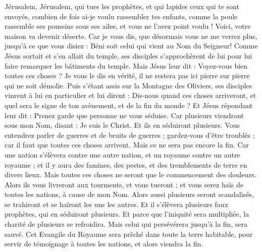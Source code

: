 \begin{multicols}{2}
Jérusalem, Jérusalem, qui tues les prophètes, et qui lapides ceux qui te sont envoyés, combien de fois ai-je voulu rassembler tes enfants, comme la poule rassemble ses poussins sous ses ailes, et vous ne l'avez point voulu !
Voici, votre maison va devenir déserte.
Car je vous dis, que désormais vous ne me verrez plus, jusqu'à ce que vous disiez : Béni soit celui qui vient au Nom du Seigneur!
\VerseOne{}Comme Jésus sortait et s'en allait du temple, ses disciples s'approchèrent de lui pour lui faire remarquer les bâtiments du temple.
Mais Jésus leur dit : Voyez-vous bien toutes ces choses ? Je vous le dis en vérité, il ne restera pas ici pierre sur pierre qui ne soit démolie.
Puis s'étant assis sur la Montagne des Oliviers, ses disciples vinrent à lui en particulier et lui dirent : Dis-nous quand ces choses arriveront, et quel sera le signe de ton avènement, et de la fin du monde ?
Et Jésus répondant leur dit : Prenez garde que personne ne vous séduise.
Car plusieurs viendront sous mon Nom, disant : Je suis le Christ. Et ils en séduiront plusieurs.
Vous entendrez parler de guerres et de bruits de guerres ; gardez-vous d'être troublés ; car il faut que toutes ces choses arrivent. Mais ce ne sera pas encore la fin.
Car une nation s'élèvera contre une autre nation, et un royaume contre un autre royaume ; et il y aura des famines, des pestes, et des tremblements de terre en divers lieux.
Mais toutes ces choses ne seront que le commencement des douleurs.
Alors ils vous livreront aux tourments, et vous tueront ; et vous serez haïs de toutes les nations, à cause de mon Nom.
Alors aussi plusieurs seront scandalisés, se trahiront et se haïront les uns les autres.
Et il s'élèvera plusieurs faux prophètes, qui en séduiront plusieurs.
Et parce que l'iniquité sera multipliée, la charité de plusieurs se refroidira.
Mais celui qui persévérera jusqu'à la fin, sera sauvé.
Cet Evangile du Royaume sera prêché dans toute la terre habitable, pour servir de témoignage à toutes les nations, et alors viendra la fin.

\end{multicols}
